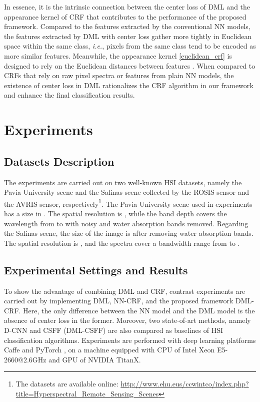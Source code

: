 \documentclass[]{article}
\newcommand{\red}{\color{black}}
\newcommand{\magentaso}{\color{black}}
\begin{document}
{\red In essence, it is the intrinsic connection between the center loss of DML and the appearance kernel {\magentaso of} CRF that contributes
to the performance of the proposed framework. Compared to the features extracted by the conventional NN models, 
the features extracted by DML with center loss gather more tightly
{\magentaso in Euclidean space within the same class}, {\em i.e.}, 
pixels from the same class tend to be encoded as more similar features.
Meanwhile, the appearance kernel \eqref{euclidean_crf} is designed to rely on 
the Euclidean distances between features .}
When compared to CRFs that rely on raw pixel spectra or features from plain NN models,
the existence of center loss in DML {\magentaso rationalizes} the CRF algorithm in our 
framework and enhance the final classification results.

\section{Experiments}\label{sec: Experiments}
\subsection{Datasets Description}
The experiments are carried out on two well-known HSI datasets,
namely the Pavia University scene and the Salinas scene collected by the
ROSIS sensor and the AVRIS sensor, respectively{\footnote{The datasets are available online: \url{http://www.ehu.eus/ccwintco/index.php?title=Hyperspectral_Remote_Sensing_Scenes}}}.
The Pavia University scene used in experiments has a size
 in .
The spatial resolution is , 
while the band depth covers the wavelength from  
to  with  noisy and water absorption bands removed.
{\red Regarding the Salinas scene, the size of the image is  
after removing  water absorption bands. 
The spatial resolution is , and the spectra cover a bandwidth 
range from  to .}

\subsection{Experimental Settings and Results}
To show the advantage of combining DML and CRF, {\red contrast} experiments are carried out by 
{\magentaso implementing} DML, NN-CRF, and the proposed framework DML-CRF.
Here, the only difference between the NN model and the DML model is the absence of 
center loss in the former. Moreover, two state-of-art methods,
namely D-CNN \cite{chen2016deep} and CSFF (DML-CSFF) \cite{guo2018cnn} are also compared 
as baselines of HSI classification algorithms.
Experiments are {\magentaso performed} with deep learning platforms Caffe \cite{jia2014caffe} and PyTorch \cite{paszke2017automatic},
on a machine equipped with CPU of Intel Xeon E5-2660@2.6GHz and
GPU of NVIDIA TitanX.
\end{document}
